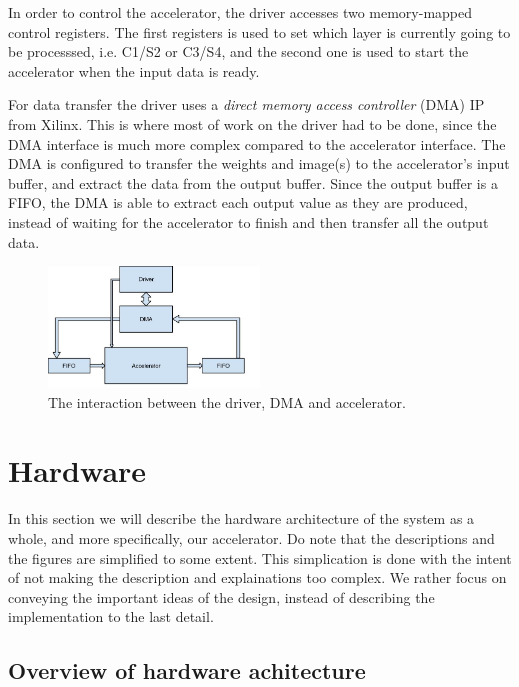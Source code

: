 In order to control the accelerator, the driver accesses two memory-mapped control registers. The first registers is used to set which layer is currently going to be processsed, i.e. C1/S2 or C3/S4, and the second one is used to start the accelerator when the input data is ready. 

For data transfer the driver uses a \textit{direct memory access controller} (DMA) IP from Xilinx. This is where most of work on the driver had to be done, since the DMA interface is much more complex compared to the accelerator interface. The DMA is configured to transfer the weights and image(s) to the accelerator's input buffer, and extract the data from the output buffer. Since the output buffer is a FIFO, the DMA is able to extract each output value as they are produced, instead of waiting for the accelerator to finish and then transfer all the output data. 


\begin{figure}[h!]
  \centering
      \includegraphics[width=0.5\textwidth]{Figures/Method/DriverAcceleratorInteraction}
    \caption{The interaction between the driver, DMA and accelerator.}
    \label{fig_driver_acc_interact}
\end{figure}
 

\section{Hardware}

In this section we will describe the hardware architecture of the system as a whole, and more specifically, our accelerator. Do note that the descriptions and the figures are simplified to some extent. This simplication is done with the intent of not making the description and explainations too complex. We rather focus on conveying the important ideas of the design, instead of describing the implementation to the last detail. 

\subsection{Overview of hardware achitecture}


